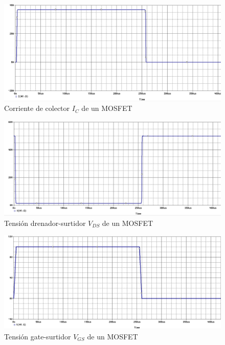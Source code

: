 \documentclass[conference]{IEEEtran}
\begin{document}
\begin{figure}[H]
	\centering
	\includegraphics[width=\columnwidth]{imagenes/ic_mosfet}
	\caption{Corriente de colector $I_C$ de un MOSFET}
	\label{fig:ic_mosfet}
\end{figure}

\begin{figure}[H]
	\centering
	\includegraphics[width=\columnwidth]{imagenes/vds_mosfet}
	\caption{Tensión drenador-surtidor $V_{DS}$ de un MOSFET}
	\label{fig:vds_mosfet}
\end{figure}

\begin{figure}[H]
	\centering
	\includegraphics[width=\columnwidth]{imagenes/vgs_mosfet}
	\caption{Tensión gate-surtidor $V_{GS}$ de un MOSFET}
	\label{fig:vgs_mosfet}
\end{figure}
\end{document}
